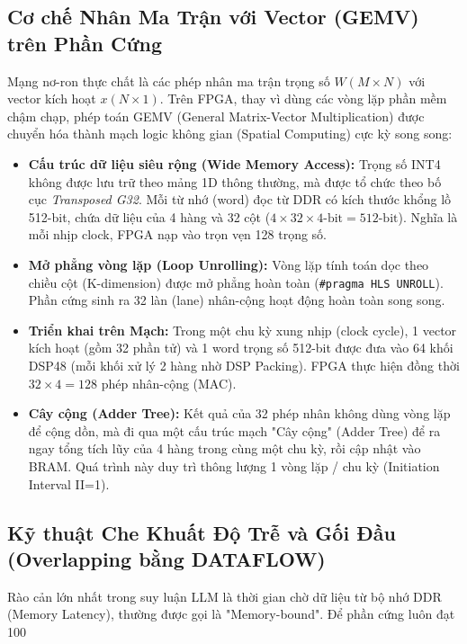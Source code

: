 \documentclass[12pt,a4paper]{article}
\begin{document}
\subsection{Cơ chế Nhân Ma Trận với Vector (GEMV) trên Phần Cứng}
Mạng nơ-ron thực chất là các phép nhân ma trận trọng số $W (M \times N)$ với vector kích hoạt $x (N \times 1)$. Trên FPGA, thay vì dùng các vòng lặp phần mềm chậm chạp, phép toán GEMV (General Matrix-Vector Multiplication) được chuyển hóa thành mạch logic không gian (Spatial Computing) cực kỳ song song:

\begin{itemize}
    \item \textbf{Cấu trúc dữ liệu siêu rộng (Wide Memory Access):} Trọng số INT4 không được lưu trữ theo mảng 1D thông thường, mà được tổ chức theo bố cục \textit{Transposed G32}. Mỗi từ nhớ (word) đọc từ DDR có kích thước khổng lồ 512-bit, chứa dữ liệu của 4 hàng và 32 cột ($4 \times 32 \times 4\text{-bit} = 512\text{-bit}$). Nghĩa là mỗi nhịp clock, FPGA nạp vào trọn vẹn 128 trọng số.
    \item \textbf{Mở phẳng vòng lặp (Loop Unrolling):} Vòng lặp tính toán dọc theo chiều cột (K-dimension) được mở phẳng hoàn toàn (\texttt{\#pragma HLS UNROLL}). Phần cứng sinh ra 32 làn (lane) nhân-cộng hoạt động hoàn toàn song song.
    \item \textbf{Triển khai trên Mạch:} Trong một chu kỳ xung nhịp (clock cycle), 1 vector kích hoạt (gồm 32 phần tử) và 1 word trọng số 512-bit được đưa vào 64 khối DSP48 (mỗi khối xử lý 2 hàng nhờ DSP Packing). FPGA thực hiện đồng thời $32 \times 4 = 128$ phép nhân-cộng (MAC).
    \item \textbf{Cây cộng (Adder Tree):} Kết quả của 32 phép nhân không dùng vòng lặp để cộng dồn, mà đi qua một cấu trúc mạch "Cây cộng" (Adder Tree) để ra ngay tổng tích lũy của 4 hàng trong cùng một chu kỳ, rồi cập nhật vào BRAM. Quá trình này duy trì thông lượng 1 vòng lặp / chu kỳ (Initiation Interval II=1).
\end{itemize}

\subsection{Kỹ thuật Che Khuất Độ Trễ và Gối Đầu (Overlapping bằng DATAFLOW)}
Rào cản lớn nhất trong suy luận LLM là thời gian chờ dữ liệu từ bộ nhớ DDR (Memory Latency), thường được gọi là "Memory-bound". Để phần cứng luôn đạt 100%
\end{document}
